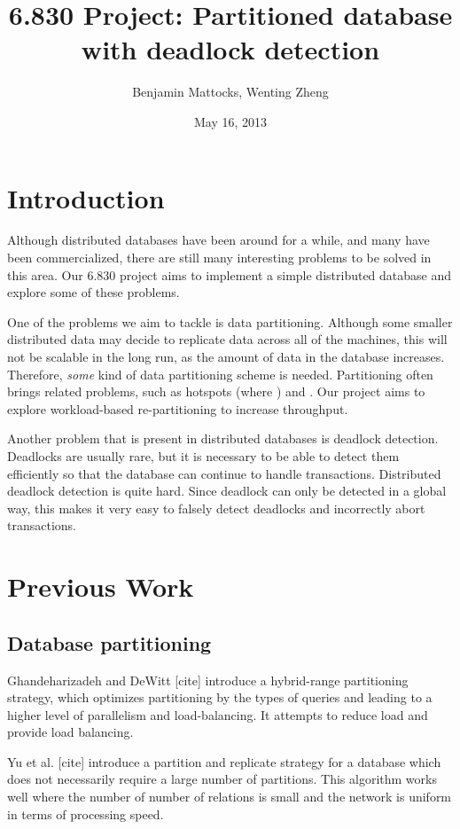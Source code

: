 \documentclass[a4paper, 10pt, notitlepage]{article}
\title{6.830 Project: Partitioned database with deadlock detection}
\author{Benjamin Mattocks, Wenting Zheng}
\date{May 16, 2013} %
\begin{document}
\maketitle
\thispagestyle{empty}
\newpage


\section{Introduction}

Although distributed databases have been around for a while, and many have been commercialized, there are still many
interesting problems to be solved in this area. Our 6.830 project aims to implement a simple distributed database
and explore some of these problems.

One of the problems we aim to tackle is data partitioning. Although some smaller distributed data may decide to replicate
data across all of the machines, this will not be scalable in the long run, as the amount of data in the database
increases. Therefore, {\em some} kind of data partitioning scheme is needed. Partitioning often brings related problems, such
as hotspots (where ) and . Our project aims to explore workload-based re-partitioning to increase throughput.

Another problem that is present in distributed databases is deadlock detection. Deadlocks are usually rare, but it is necessary
to be able to detect them efficiently so that the database can continue to handle transactions. Distributed deadlock detection
is quite hard. Since deadlock can only be detected in a global way, this makes it very easy to falsely detect deadlocks and
incorrectly abort transactions.


\section{Previous Work}

\subsection{Database partitioning}
Ghandeharizadeh and DeWitt [cite] introduce a hybrid-range partitioning strategy, which optimizes partitioning by the types of queries and leading to a higher level of parallelism and load-balancing. It attempts to reduce load and provide load balancing.

Yu et al. [cite] introduce a partition and replicate strategy for a database which does not necessarily require a large number of partitions. This algorithm works well where the number of number of relations is small and the network is uniform in terms of processing speed.
\end{document}

